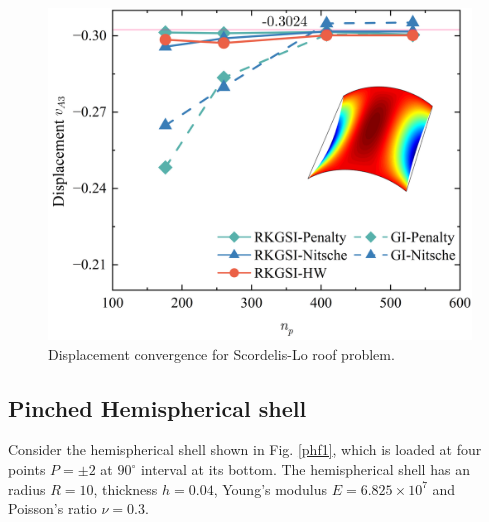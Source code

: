\begin{figure}[!ht]
\centering
\includegraphics[width=\textwidth]{figures/sld_r1}
\caption{Displacement convergence for Scordelis-Lo roof problem.}\label{slf4}
\end{figure}

\subsection{Pinched Hemispherical shell}
Consider the hemispherical shell shown in Fig. \ref{phf1}, which is loaded at four points $P=\pm 2$ at $90^\circ$ interval at its bottom. The hemispherical shell has an radius $R=10$, thickness $h=0.04$, Young's modulus $E=6.825\times10^7$ and Poisson's ratio $\nu = 0.3$.

